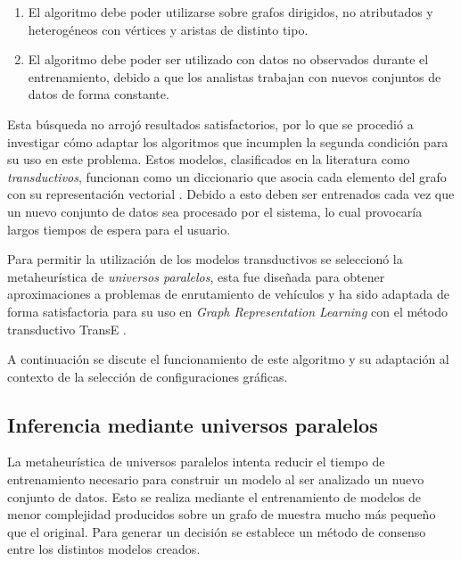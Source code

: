 \begin{enumerate}
    \item El algoritmo debe poder utilizarse sobre grafos dirigidos, no atributados y heterog\'eneos con
    v\'ertices y aristas de distinto tipo.
    \item El algoritmo debe poder ser utilizado con datos no observados durante el entrenamiento, debido
    a que los analistas trabajan con nuevos conjuntos de datos de forma constante.
\end{enumerate}

Esta b\'usqueda no arroj\'o resultados
satisfactorios, por lo que se procedi\'o a investigar
c\'omo adaptar los algoritmos
que incumplen la segunda condici\'on para su uso en este problema. Estos modelos,
clasificados en la literatura como \textit{transductivos}, funcionan
como un diccionario que asocia cada elemento del grafo con su representaci\'on
vectorial \cite{cai2018comprehensive}. Debido a esto deben ser entrenados cada vez que un nuevo conjunto de datos
sea procesado por el sistema, lo cual provocar\'ia largos tiempos de espera para el usuario.

Para permitir la utilizaci\'on de los modelos transductivos se seleccion\'o la metaheur\'istica de \textit{universos paralelos}, esta
fue dise\~nada para obtener aproximaciones a problemas de enrutamiento de veh\'iculos \cite{bayat2014parallel} y ha sido
adaptada de forma satisfactoria para su uso en \textit{Graph Representation Learning} con el m\'etodo transductivo TransE \cite{tay2017non}.


A continuaci\'on se discute el funcionamiento de este algoritmo y su adaptaci\'on al contexto de la
selecci\'on de configuraciones gr\'aficas.


\subsection{Inferencia mediante universos paralelos}

La metaheur\'istica de universos paralelos intenta reducir el tiempo de
entrenamiento necesario para construir un modelo al ser analizado
un nuevo conjunto de datos. Esto se realiza mediante el
entrenamiento de modelos de menor complejidad producidos sobre
un grafo de muestra mucho m\'as peque\~no que el original. Para
generar un decisi\'on se establece un m\'etodo de consenso 
entre los distintos modelos creados.


